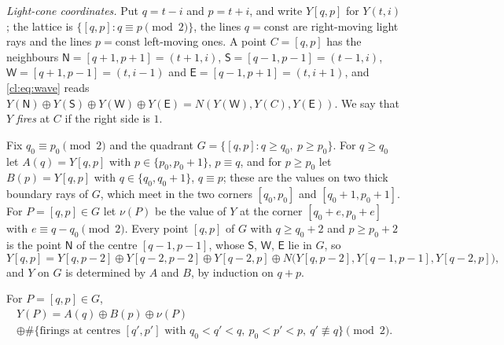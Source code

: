 \emph{Light-cone coordinates.} Put $q=t-i$ and $p=t+i$, and write $Y[q,p]$ for $Y(t,i)$; the lattice is $\{[q,p]:q\equiv p\pmod2\}$, the lines $q=\mathrm{const}$ are right-moving light rays and the lines $p=\mathrm{const}$ left-moving ones. A point $C=[q,p]$ has the neighbours $\mathsf N=[q+1,p+1]=(t+1,i)$, $\mathsf S=[q-1,p-1]=(t-1,i)$, $\mathsf W=[q+1,p-1]=(t,i-1)$ and $\mathsf E=[q-1,p+1]=(t,i+1)$, and \eqref{cl:eq:wave} reads $Y(\mathsf N)\oplus Y(\mathsf S)\oplus Y(\mathsf W)\oplus Y(\mathsf E)=N(Y(\mathsf W),Y(C),Y(\mathsf E))$. We say that $Y$ \emph{fires} at $C$ if the right side is $1$.

Fix $q_0\equiv p_0\pmod2$ and the quadrant $G=\{[q,p]:q\ge q_0,\ p\ge p_0\}$. For $q\ge q_0$ let $A(q)=Y[q,p]$ with $p\in\{p_0,p_0+1\}$, $p\equiv q$, and for $p\ge p_0$ let $B(p)=Y[q,p]$ with $q\in\{q_0,q_0+1\}$, $q\equiv p$; these are the values on two thick boundary rays of $G$, which meet in the two corners $[q_0,p_0]$ and $[q_0+1,p_0+1]$. For $P=[q,p]\in G$ let $\nu(P)$ be the value of $Y$ at the corner $[q_0+e,p_0+e]$ with $e\equiv q-q_0\pmod2$. Every point $[q,p]$ of $G$ with $q\ge q_0+2$ and $p\ge p_0+2$ is the point $\mathsf N$ of the centre $[q-1,p-1]$, whose $\mathsf S$, $\mathsf W$, $\mathsf E$ lie in $G$, so
\begin{equation}\label{cl:eq:goursat}
Y[q,p]=Y[q,p-2]\oplus Y[q-2,p-2]\oplus Y[q-2,p]\oplus N\bigl(Y[q,p-2],Y[q-1,p-1],Y[q-2,p]\bigr),
\end{equation}
and $Y$ on $G$ is determined by $A$ and $B$, by induction on $q+p$.

\begin{lemma}\label{cl:lem:dalembert}
For $P=[q,p]\in G$,
\begin{multline*}
Y(P)=A(q)\oplus B(p)\oplus\nu(P)\\
\oplus\#\{\text{firings at centres }[q',p']\text{ with }q_0<q'<q,\ p_0<p'<p,\ q'\not\equiv q\}\pmod2.
\end{multline*}
\end{lemma}

